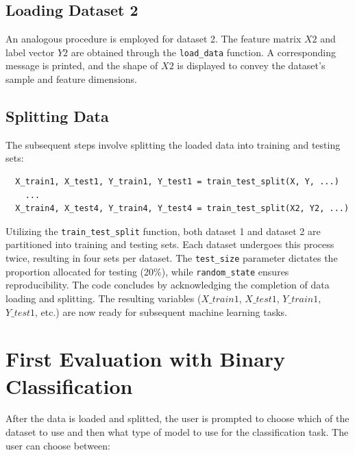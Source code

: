 \documentclass{article}
\begin{document}
\begin{titlepage}
  \subsection{Loading Dataset 2}
  An analogous procedure is employed for dataset 2. The feature matrix \(X2\) and label vector \(Y2\) are obtained through the \texttt{load\_data} function. A corresponding message is printed, and the shape of \(X2\) is displayed to convey the dataset's sample and feature dimensions.

  \subsection{Splitting Data}
  The subsequent steps involve splitting the loaded data into training and testing sets:

  \begin{verbatim}
  X_train1, X_test1, Y_train1, Y_test1 = train_test_split(X, Y, ...)
    ...
  X_train4, X_test4, Y_train4, Y_test4 = train_test_split(X2, Y2, ...)
  \end{verbatim}

  Utilizing the \texttt{train\_test\_split} function, both dataset 1 and dataset 2 are partitioned into training and testing sets. Each dataset undergoes this process twice, resulting in four sets per dataset.
  The \texttt{test\_size} parameter dictates the proportion allocated for testing (20\%), while \texttt{random\_state} ensures reproducibility.
  \newline
  \newline
  The code concludes by acknowledging the completion of data loading and splitting.
  \newline
  \newline
  The resulting variables (\(X\_train1\), \(X\_test1\), \(Y\_train1\), \(Y\_test1\), etc.) are now ready for subsequent machine learning tasks.

  \section*{First Evaluation with Binary Classification}
  After the data is loaded and splitted, the user is prompted to choose which of the dataset to use and then what type of model to use for the classification task. The user can choose between:

\end{titlepage}
\end{document}
